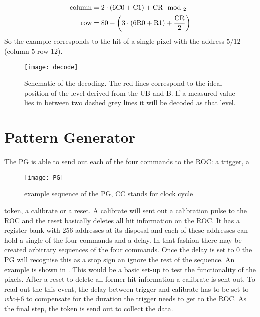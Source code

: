 \begin{align}
	\text{column} &= 	2\cdot\left(  6\text{C}0 + \text{C}1 \right) + \text{CR}\mod_{2}\\
	\text{row} &= 80 - \left( 3\cdot\left(  6\text{R}0 + \text{R}1 \right) + \frac{\text{CR}}{2}\right)
\end{align}
So the example corresponds to the hit of a single pixel with the address $5/12$ (column $5$ row $12$).
\begin{figure}[ht]
	\texttt{[image: decode]}
	\caption{Schematic of the decoding. The red lines correspond to the ideal position of the level derived from the \ac{UB} and \ac{B}. If a measured value lies in between two dashed grey lines it will be decoded as that level.}
	\label{p15}
\end{figure}

\section{Pattern Generator}
The \ac{PG} is able to send out each of the four commands to the \ac{ROC}: a trigger, a  
\begin{wrapfigure}{r}{3.5cm}
	\texttt{[image: PG]}
	\caption{example sequence of the \ac{PG}, CC stands for clock cycle}
	\label{p14}
\end{wrapfigure} 
token, a calibrate or a reset. A calibrate will sent out a calibration pulse to the \ac{ROC} and the reset basically deletes all hit information on the \ac{ROC}. It has a register bank with $256$ addresses at its disposal and each of these addresses can hold a single of the four commands and a delay. In that fashion there may be created arbitrary sequences of the four commands. Once the delay is set to $0$ the \ac{PG} will recognise this as a stop sign an ignore the rest of the sequence. An example is shown in . This would be a basic set-up to test the functionality of the pixels. After a reset to delete all former hit information a calibrate is sent out. To read out the this event, the delay between trigger and calibrate has to be set to \textit{wbc}$+6$ to compensate for the duration the trigger needs to get to the \ac{ROC}. As the final step, the token is send out to collect the data.
